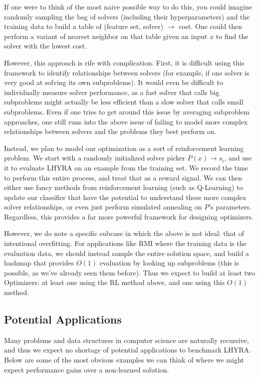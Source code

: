 \documentclass{article}
\begin{document}
If one were to think of the most naive possible way to do this, you could imagine randomly sampling the bag of solvers (including their hyperparameters) and the training data to build a table of (feature set, solver) $\rightarrow$ cost. One could then perform a variant of nearest neighbor on that table given an input $x$ to find the solver with the lowest cost.

However, this approach is rife with complication. First, it is difficult using this framework to identify relationships between solvers (for example, if one solver is very good at solving its own subproblems). It would even be difficult to individually measure solver performance, as a fast solver that calls big subproblems might actually be less efficient than a slow solver that calls small subproblems. Even if one tries to get around this issue by averaging subproblem approaches, one still runs into the above issue of failing to model more complex relationships between solvers and the problems they best perform on. 

Instead, we plan to model our optimization as a sort of reinforcement learning problem.  We start with a randomly initialized solver picker $P(x) \rightarrow s_i$, and use it to evaluate LHYRA on an example from the training set.  We record the time to perform this entire process, and treat that as a reward signal.  We can then either use fancy methods from reinforcement learning (such as Q-Learning) to update our classifier that have the potential to understand these more complex solver relationships, or even just perform simulated annealing on $P$'s parameters.  Regardless, this provides a far more powerful framework for designing optimizers.

However, we do note a specific subcase in which the above is not ideal: that of intentional overfitting.  For applications like RMI where the training data is the evaluation data, we should instead sample the entire solution space, and build a hashmap that provides $O(1)$ evaluation by looking up subproblems (this is possible, as we’ve already seen them before).  Thus we expect to build at least two Optimizers: at least one using the RL method above, and one using this $O(1)$ method.

\subsection*{Potential Applications}

Many problems and data structures in computer science are naturally recursive, and thus we expect no shortage of potential applications to benchmark LHYRA. Below are some of the most obvious examples we can think of where we might expect performance gains over a non-learned solution.
\end{document}
